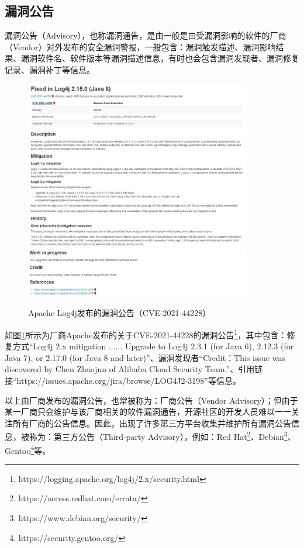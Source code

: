 \subsection{漏洞公告} 
漏洞公告（Advisory），也称漏洞通告，是由一般是由受漏洞影响的软件的厂商（Vendor）对外发布的安全漏洞警报，一般包含：漏洞触发描述、漏洞影响结果、漏洞软件名、软件版本等漏洞描述信息，有时也会包含漏洞发现者、漏洞修复记录、漏洞补丁等信息。

\begin{figure}[h]
    \centering
    \includegraphics[width=0.88\textwidth]{res/Vendor-2021-44228}
    \includegraphics[width=0.88\textwidth]{res/Vendor-2021-44228-2}
    \caption{Apache Log4j发布的漏洞公告（CVE-2021-44228）}
    \label{fig:Vendor-2021-44228}
\end{figure}

如图\ref{fig:Vendor-2021-44228}所示为厂商Apache发布的关于CVE-2021-44228的漏洞公告\footnote{https://logging.apache.org/log4j/2.x/security.html}，其中包含：修复方式“Log4j 2.x mitigation ...... Upgrade to Log4j 2.3.1 (for Java 6), 2.12.3 (for Java 7), or 2.17.0 (for Java 8 and later)”、漏洞发现者“Credit：This issue was discovered by Chen Zhaojun of Alibaba Cloud Security Team.”、引用链接“https://issues.apache.org/jira/browse/LOG4J2-3198”等信息。


以上由厂商发布的漏洞公告，也常被称为：厂商公告（Vendor Advisory）；但由于某一厂商只会维护与该厂商相关的软件漏洞通告，开源社区的开发人员难以一一关注所有厂商的公告信息。因此，出现了许多第三方平台收集并维护所有漏洞公告信息，被称为：第三方公告（Third-party Advisory），例如：Red Hat\footnote{https://access.redhat.com/errata/}、Debian\footnote{https://www.debian.org/security/}、Gentoo\footnote{https://security.gentoo.org/}等。

